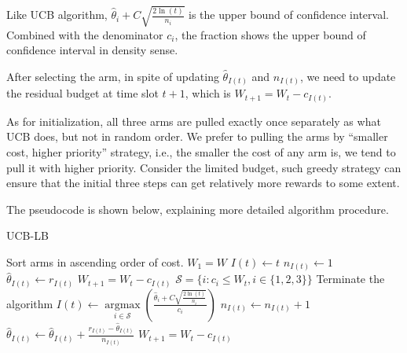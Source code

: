 \documentclass[11pt]{article}
\begin{document}
Like UCB algorithm, \(\hat{\theta}_i+C\sqrt{\frac{2\ln(t)}{n_i}}\) is
the upper bound of confidence interval. Combined with the denominator
\(c_i\), the fraction shows the upper bound of confidence interval in
density sense.

After selecting the arm, in spite of updating \(\hat\theta_{I(t)}\) and
\(n_{I(t)}\), we need to update the residual budget at time slot
\(t+1\), which is \(W_{t+1}=W_t-c_{I(t)}\).

As for initialization, all three arms are pulled exactly once separately
as what UCB does, but not in random order. We prefer to pulling the arms
by ``smaller cost, higher priority'' strategy, i.e., the smaller the
cost of any arm is, we tend to pull it with higher priority. Consider
the limited budget, such greedy strategy can ensure that the initial
three steps can get relatively more rewards to some extent.

The pseudocode is shown below, explaining more detailed algorithm
procedure.
\pagebreak
\begin{algorithm}
\caption{UCB-LB}
\begin{algorithmic}[1]
    \Ensure Sort arms in ascending order of cost.
    \State $W_1=W$
    \State $I(t)\gets t$
    \State $n_{I(t)}\gets 1$
    \State $\hat{\theta}_{I(t)}\gets r_{I(t)}$
    \State $W_{t+1}=W_t-c_{I(t)}$
    \EndFor
    \State $\mathcal{S}=\Big\{i:c_i\leqslant W_t,i\in\{1,2,3\}\Big\}$
    \State Terminate the algorithm
    \EndIf
    \State $I(t)\gets\mathop{\arg\max}\limits_{i\in\mathcal{S}}\left(\frac{\hat{\theta}_i+C\sqrt{\frac{2\ln(t)}{n_i}}}{c_i}\right)$
    \State $n_{I(t)}\gets n_{I(t)}+1$
    \State $\hat{\theta}_{I(t)}\gets\hat{\theta}_{I(t)}+\frac{r_{I(t)}-\hat{\theta}_{I(t)}}{n_{I(t)}}$
    \State $W_{t+1}=W_t-c_{I(t)}$
    \EndFor
\end{algorithmic}
\end{algorithm}
    
\end{document}
